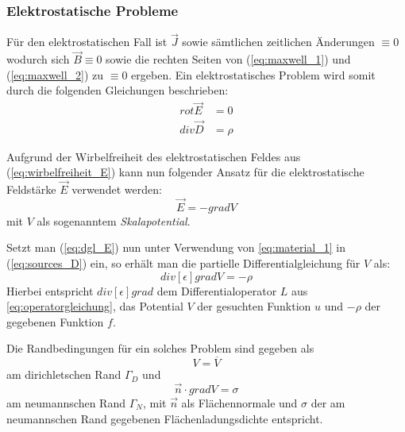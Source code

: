 \subsubsection{Elektrostatische Probleme}
Für den elektrostatischen Fall ist $\vec{J}$ sowie sämtlichen zeitlichen Änderungen $\equiv 0$ wodurch sich $\vec{B} \equiv 0$ sowie die rechten Seiten von (\ref{eq:maxwell_1}) und  (\ref{eq:maxwell_2}) zu $\equiv 0$ ergeben.\newline
Ein elektrostatisches Problem wird somit durch die folgenden Gleichungen beschrieben:
\begin{align}
\mathit{rot}\vec{E} &= 0 \label{eq:wirbelfreiheit_E}\\
\mathit{div}\vec{D} &= \rho \label{eq:sources_D}
\end{align}\newline

Aufgrund der Wirbelfreiheit des elektrostatischen Feldes aus (\ref{eq:wirbelfreiheit_E}) kann nun folgender Ansatz für die elektrostatische Feldstärke $\vec{E}$ verwendet werden:
\begin{equation}
\label{eq:dgl_E}
\vec{E} = -\mathit{grad}V
\end{equation}
mit $V$ als sogenanntem \textit{Skalapotential}.\newline

Setzt man (\ref{eq:dgl_E}) nun unter Verwendung von \ref{eq:material_1} in (\ref{eq:sources_D}) ein, so erhält man die partielle Differentialgleichung für $V$ als:
\begin{equation}
\mathit{div}[\epsilon]\mathit{grad}V = -\rho
\end{equation}
Hierbei entspricht $\mathit{div}[\epsilon]\mathit{grad}$ dem Differentialoperator $L$ aus \ref{eq:operatorgleichung}, das Potential $V$ der gesuchten Funktion $u$ und $-\rho$ der gegebenen Funktion $f$.\newline

Die Randbedingungen für ein solches Problem sind gegeben als
\begin{equation}
\label{eq:e-static_dirichlet_condition}
	V = \overline{V}
\end{equation}
am dirichletschen Rand $\Gamma_D$ und 
\begin{equation}
\label{eq:e-static_neumann_condition}
\vec{n}\cdot\mathit{grad}V = \sigma 
\end{equation}
am neumannschen Rand $\Gamma_N$, mit $\vec{n}$ als Flächennormale und $\sigma$ der am neumannschen Rand gegebenen Flächenladungsdichte entspricht.\newline

